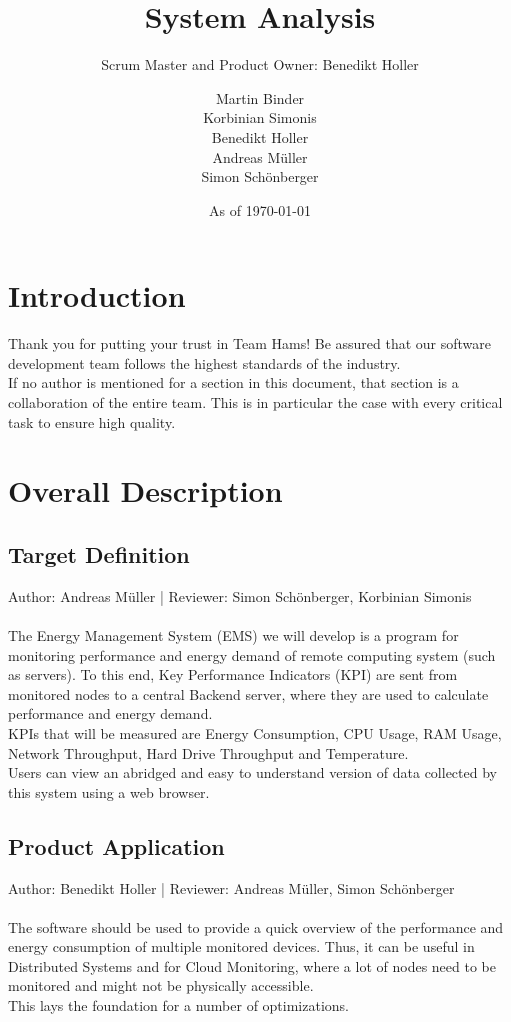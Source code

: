 \documentclass{scrreprt}
\title{System Analysis}
\subtitle{Scrum Master and Product Owner: Benedikt Holler}
\author{Martin Binder\\Korbinian Simonis\\Benedikt Holler\\Andreas M\"uller\\Simon Sch\"onberger}
\date{As of \today}
\begin{document}
\maketitle
\tableofcontents


\chapter{Introduction}
Thank you for putting your trust in Team Hams! Be assured that our software development team follows the highest standards of the industry. \\
If no author is mentioned for a section in this document, that section is a collaboration of the entire team. This is in particular the case with every critical task to ensure high quality. 
\chapter{Overall Description}

\section{Target Definition}
Author:  Andreas M\"uller |
Reviewer:  Simon Sch\"onberger, Korbinian Simonis \\ \\
The Energy Management System (EMS) we will develop is a program for monitoring performance and energy demand of remote computing system (such as servers). To this end, Key Performance Indicators (KPI) are sent from monitored nodes to a central Backend server, where they are used to calculate performance and energy demand. \\
KPIs that will be measured are Energy Consumption, CPU Usage, RAM Usage, Network Throughput, Hard Drive Throughput and Temperature. \\
Users can view an abridged and easy to understand version of data collected by this system using a web browser.
\section{Product Application}
Author: Benedikt Holler |
Reviewer: Andreas M\"uller, Simon Sch\"onberger \\ \\
The software should be used to provide a quick overview of the performance and energy consumption of multiple monitored devices. Thus, it can be useful in Distributed Systems and for Cloud Monitoring, where a lot of nodes need to be monitored and might not be physically accessible. \\
This lays the foundation for a number of optimizations.
\end{document}
